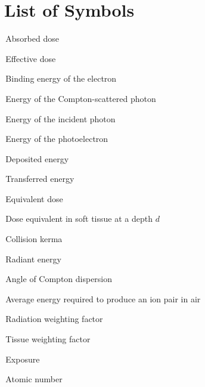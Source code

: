 
\chapter*{List of Symbols}
\begin{description}[style=unboxed]
  \item[$D$] \textendash\,Absorbed dose 
  \item[$E$] \textendash\,Effective dose
  \item[$E_b$] \textendash\,Binding energy of the electron
  \item[$E_c$] \textendash\,Energy of the Compton-scattered photon
  \item[$E_o$] \textendash\,Energy of the incident photon
  \item[$E_{pe}$] \textendash\,Energy of the photoelectron
  \item[$\varepsilon$] \textendash\,Deposited energy
  \item[$\varepsilon_{tr}$] \textendash\,Transferred energy
  \item[$H$] \textendash\,Equivalent dose
  \item[$H_p(d)$] \textendash\,Dose equivalent in soft tissue at a depth $d$
  \item[$K_{col}$] \textendash\,Collision kerma
  \item[$R$] \textendash\,Radiant energy
  \item[$\theta$] \textendash\,Angle of Compton dispersion
  \item[$\bar{W}_{air}$] \textendash\,Average energy required to produce an ion pair in air
  \item[$w_R$] \textendash\,Radiation weighting factor
  \item[$w_T$] \textendash\,Tissue weighting factor
  \item[$X$] \textendash\,Exposure
  \item[$Z$] \textendash\,Atomic number
\end{description}
